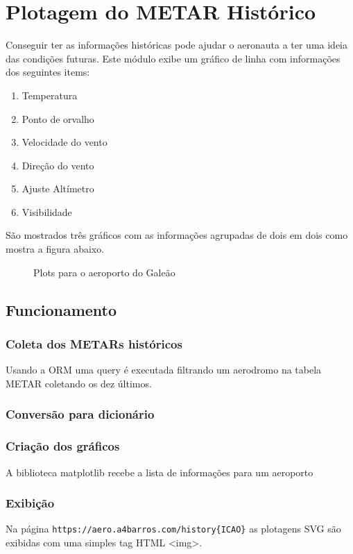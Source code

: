 \chapter{Plotagem do METAR Histórico}

Conseguir ter as informações históricas pode ajudar o aeronauta a ter uma ideia
das condições futuras. Este módulo exibe um gráfico de linha com informações dos
seguintes items:

\begin{enumerate}
	\item Temperatura
	\item Ponto de orvalho
	\item Velocidade do vento
	\item Direção do vento
	\item Ajuste Altímetro
	\item Visibilidade
\end{enumerate}

São mostrados três gráficos com as informações agrupadas de dois em dois como
mostra a figura abaixo.

\begin{figure}[ht]
    \begin{center}
    
    \caption{Plots para o aeroporto do Galeão}
    \label{fig:plot-sbgl}
    \end{center}
\end{figure}


\section{Funcionamento}
\subsection{Coleta dos METARs históricos}
Usando a ORM uma query é executada filtrando um aerodromo na tabela METAR coletando
os dez últimos.

\subsection{Conversão para dicionário}

\subsection{Criação dos gráficos}
A biblioteca matplotlib recebe a lista de informações para um aeroporto

\subsection{Exibição}
Na página \texttt{https://aero.a4barros.com/history\{ICAO\}} as plotagens SVG
são exibidas com uma simples tag HTML <img>.
